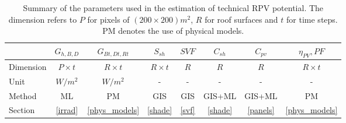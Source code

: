 \begin{table}[tb]
\centering
\footnotesize
\begin{tabular} {lccccccc} %
\hline 
  & $G_{h,B,D}$ & $G_{Bt,Dt,Rt}$ & $S_{sh}$   & $SVF$  & $C_{sh}$  & $C_{pv}$ & $\eta_{PV}, PF$     
  \\
\hline 
Dimension & $P \times t$ & $R \times t$ & $R \times t$ & $R$   & $R$     & $R$      & $R \times t$  
\\
Unit     & $W/m^2$    & $W/m^2$  & -                          & -                  & -                    & -                     & -                             
\\
Method      & ML & PM & GIS & GIS & GIS+ML & GIS+ML & PM \\
Section      & \ref{irrad}  & \ref{phys_models}     & \ref{shade}       & \ref{svf} & \ref{shade} & \ref{panels} & \ref{phys_models} 
\\  
\hline 
\end{tabular}
\caption{Summary of the parameters used in the estimation of technical RPV potential. The dimension refers to $P$ for pixels of $(200 \times 200)m^2$, $R$ for roof surfaces and $t$ for time steps. PM denotes the use of physical models.}
\label{tab:vars}
\end{table}

